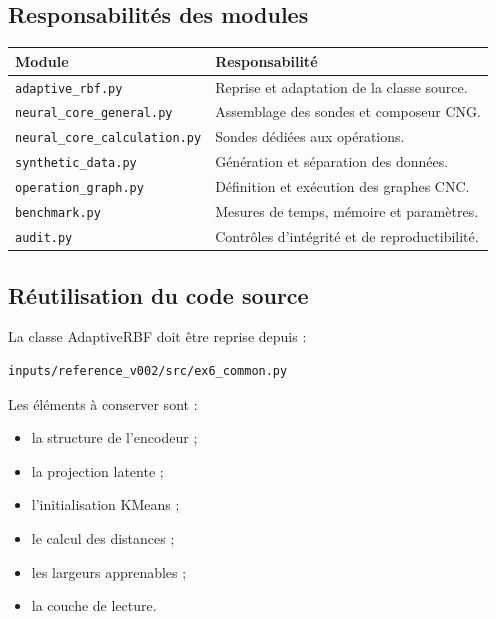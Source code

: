 \documentclass[11pt,a4paper]{article}
\begin{document}
\subsection{Responsabilités des modules}

\begin{tabularx}{\textwidth}{
    >{\RaggedRight\arraybackslash}p{}
    X
}
\toprule
\textbf{Module} & \textbf{Responsabilité} \\
\midrule
\texttt{adaptive\_rbf.py}
& Reprise et adaptation de la classe source. \\

\texttt{neural\_core\_general.py}
& Assemblage des sondes et composeur CNG. \\

\texttt{neural\_core\_calculation.py}
& Sondes dédiées aux opérations. \\

\texttt{synthetic\_data.py}
& Génération et séparation des données. \\

\texttt{operation\_graph.py}
& Définition et exécution des graphes CNC. \\

\texttt{benchmark.py}
& Mesures de temps, mémoire et paramètres. \\

\texttt{audit.py}
& Contrôles d'intégrité et de reproductibilité. \\
\bottomrule
\end{tabularx}

\subsection{Réutilisation du code source}

La classe AdaptiveRBF doit être reprise depuis :

\begin{verbatim}
inputs/reference_v002/src/ex6_common.py
\end{verbatim}

Les éléments à conserver sont :
\begin{itemize}
    \item la structure de l'encodeur ;
    \item la projection latente ;
    \item l'initialisation KMeans ;
    \item le calcul des distances ;
    \item les largeurs apprenables ;
    \item la couche de lecture.
\end{itemize}
\end{document}
